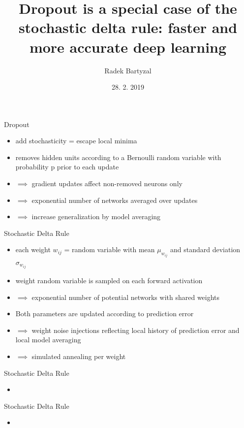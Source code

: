 \documentclass{beamer}
\begin{document}
\title{Dropout is a special case of the stochastic delta rule: faster and more accurate
deep learning}  
\author{Radek Bartyzal}
\date{28. 2. 2019} 

\frame{\titlepage} 

\begin{frame}{Dropout}

\begin{itemize}
\item add stochasticity = escape local minima
\item removes hidden units according to a Bernoulli
random variable with probability p prior to each
update

\item $\implies$ gradient updates affect non-removed neurons only
\item $\implies$ exponential number of networks averaged over updates
\item $\implies$ increase generalization by model averaging
\end{itemize}

\end{frame}
\begin{frame}{Stochastic Delta Rule}

\begin{itemize}
\item each weight $w_{ij}$ = random variable with mean $\mu_{w_{ij}}$ and standard
deviation $\sigma_{w_{ij}}$
\item weight random variable is
sampled on each forward activation
\item $\implies$ exponential number of potential networks with shared weights
\item Both parameters are
updated according to prediction error
\item $\implies$ weight noise injections reflecting local history of prediction error and local model averaging
\item $\implies$ simulated annealing per weight
\end{itemize}

\end{frame}
\begin{frame}{Stochastic Delta Rule}

\begin{itemize}
\item 
\end{itemize}

\end{frame}
\begin{frame}{Stochastic Delta Rule}

\begin{itemize}
\item 
\end{itemize}

\end{frame}
\end{document}
